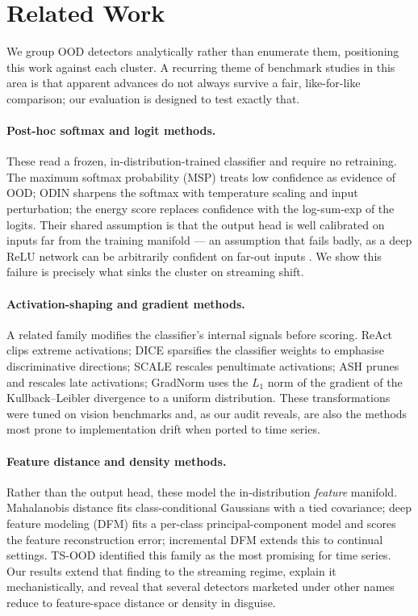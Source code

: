 \documentclass[11pt]{article}
\begin{document}
\section{Related Work}\label{sec:related}

We group OOD detectors analytically rather than enumerate them, positioning this
work against each cluster. A recurring theme of benchmark studies in this area is
that apparent advances do not always survive a fair, like-for-like comparison; our
evaluation is designed to test exactly that.

\paragraph{Post-hoc softmax and logit methods.}
These read a frozen, in-distribution-trained classifier and require no retraining.
The maximum softmax probability (MSP) \citep{Hendrycks2017} treats low confidence
as evidence of OOD; ODIN \citep{Liang2018} sharpens the softmax with temperature
scaling and input perturbation; the energy score \citep{Liu2020} replaces
confidence with the log-sum-exp of the logits. Their shared assumption is that the
output head is well calibrated on inputs far from the training manifold --- an
assumption that fails badly, as a deep ReLU network can be arbitrarily confident on
far-out inputs \citep{Hein2019, Nguyen2015}. We show this failure is precisely what
sinks the cluster on streaming shift.

\paragraph{Activation-shaping and gradient methods.}
A related family modifies the classifier's internal signals before scoring. ReAct
\citep{Sun2021} clips extreme activations; DICE \citep{Sun2022} sparsifies the
classifier weights to emphasise discriminative directions; SCALE \citep{Xu2024}
rescales penultimate activations; ASH \citep{Djurisic2023} prunes and rescales late
activations; GradNorm \citep{Huang2021} uses the $L_1$ norm of the gradient of the
Kullback--Leibler divergence to a uniform distribution. These transformations were
tuned on vision benchmarks and, as our audit reveals, are also the methods most
prone to implementation drift when ported to time series.

\paragraph{Feature distance and density methods.}
Rather than the output head, these model the in-distribution \emph{feature}
manifold. Mahalanobis distance \citep{Lee2018} fits class-conditional Gaussians
with a tied covariance; deep feature modeling (DFM) \citep{Ahuja2019} fits a
per-class principal-component model and scores the feature reconstruction error;
incremental DFM \citep{Rios2022} extends this to continual settings. TS-OOD
\citep{Gungor2025} identified this family as the most promising for time series.
Our results extend that finding to the streaming regime, explain it
mechanistically, and reveal that several detectors marketed under other names
reduce to feature-space distance or density in disguise.
\end{document}

